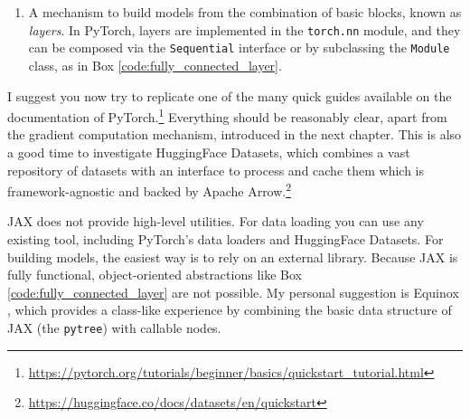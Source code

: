 \begin{enumerate}\addtocounter{enumi}{1}
\item A mechanism to build models from the combination of basic blocks, known as \textit{layers}. In PyTorch, layers are implemented in the \texttt{torch.nn} module, and they can be composed via the \texttt{Sequential} interface or by subclassing the \texttt{Module} class, as in Box \ref{code:fully_connected_layer}.
\end{enumerate}

I suggest you now try to replicate one of the many quick guides available on the documentation of PyTorch.\footnote{\url{https://pytorch.org/tutorials/beginner/basics/quickstart_tutorial.html}} Everything should be reasonably clear, apart from the gradient computation mechanism, introduced in the next chapter. This is also a good time to investigate HuggingFace Datasets, which combines a vast repository of datasets with an interface to process and cache them which is framework-agnostic and backed by Apache Arrow.\footnote{\url{https://huggingface.co/docs/datasets/en/quickstart}}

JAX does not provide high-level utilities. For data loading you can use any existing tool, including PyTorch's data loaders and HuggingFace Datasets. For building models, the easiest way is to rely on an external library. Because JAX is fully functional, object-oriented abstractions like Box \ref{code:fully_connected_layer} are not possible. My personal suggestion is Equinox \cite{kidger2021equinox}, which provides a class-like experience by combining the basic data structure of JAX (the \texttt{pytree}) with callable nodes.